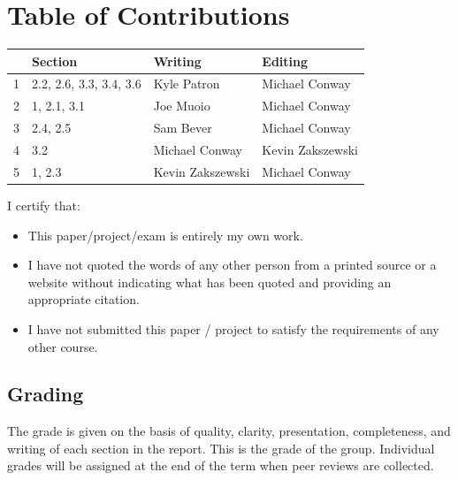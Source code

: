 \documentclass{article}
\begin{document}
\section*{\centering Table of Contributions}
\begin{tabular}{| l | l | l | l |}
    \hline
     & Section & Writing & Editing \\
    \hline \hline
		1 & 2.2, 2.6, 3.3, 3.4, 3.6 & Kyle Patron & Michael Conway\\ \hline
		2 & 1, 2.1, 3.1 & Joe Muoio & Michael Conway\\ \hline
		3 & 2.4, 2.5 & Sam Bever & Michael Conway\\ \hline
		4 & 3.2 & Michael Conway & Kevin Zakszewski \\ \hline
		5 & 1, 2.3 & Kevin Zakszewski & Michael Conway \\ \hline
\end{tabular}
\newpage
\noindent I certify that:
\begin{itemize}
\item This paper/project/exam is entirely my own work.
\item I have not quoted the words of any other person from a printed source or a website without indicating what has been quoted and providing an appropriate citation.
\item I have not submitted this paper / project to satisfy the requirements of any other course.
\end{itemize}

\vspace{1cm}
\noindent{}


\vspace{0.5cm}
\noindent{}

\vspace{0.5cm}
\noindent{}

\vspace{0.5cm}
\noindent{}

\vspace{0.5cm}
\noindent{}

\vspace{\fill}
\subsection*{Grading}
The grade is given on the basis of quality, clarity, presentation, completeness, and writing of each section in the report. This is the grade of the group. Individual grades will be assigned at the end of the term when peer reviews are collected.
\end{document}
